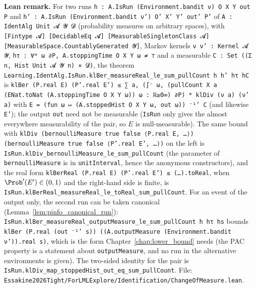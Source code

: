 \textbf{Lean remark.} For two runs \texttt{h : A.IsRun (Environment.bandit ν) O X Y out P} and
\texttt{h' : A.IsRun (Environment.bandit ν') O' X' Y' out' P'} of \texttt{A : IdentAlg Unit 𝓐 𝓨 𝓓}
(probability measures on arbitrary spaces), with \texttt{[Fintype 𝓐] [DecidableEq 𝓐]
[MeasurableSingletonClass 𝓐] [MeasurableSpace.CountablyGenerated 𝓨]}, Markov kernels
\texttt{ν ν' : Kernel 𝓐 𝓨}, \texttt{hτ : ∀ᵐ ω ∂P, A.stoppingTime O X Y ω ≠ ⊤} and a measurable
\texttt{C : Set ((Σ n, Hist Unit 𝓐 𝓨 n) × 𝓓)}, the theorem
\texttt{Learning.IdentAlg.IsRun.klBer\_measureReal\_le\_sum\_pullCount h h' hτ hC} is
\texttt{klBer (P.real E) (P'.real E') ≤ ∑ a, (∫⁻ ω, (pullCount X a (ENat.toNat
(A.stoppingTime O X Y ω)) ω : ℝ≥0∞) ∂P) * klDiv (ν a) (ν' a)} with
\texttt{E = (fun ω ↦ (A.stoppedHist O X Y ω, out ω)) ⁻¹' C} (and likewise \texttt{E'}); the output
\texttt{out} need not be measurable (\texttt{IsRun} only gives the almost everywhere
measurability of the pair, so $E$ is null-measurable). The same bound with
\texttt{klDiv (bernoulliMeasure true false ⟨P.real E, …⟩) (bernoulliMeasure true false ⟨P'.real E', …⟩)}
on the left is \texttt{IsRun.klDiv\_bernoulliMeasure\_le\_sum\_pullCount} (the parameter of
\texttt{bernoulliMeasure} is in \texttt{unitInterval}, hence the anonymous constructors), and the
real form \texttt{klBerReal (P.real E) (P'.real E') ≤ (…).toReal}, when $\Prob'(E') \in (0,1)$ and
the right-hand side is finite, is \texttt{IsRun.klBerReal\_measureReal\_le\_toReal\_sum\_pullCount}.
For an event of the output only, the second run can be taken canonical
(Lemma~\ref{lem:pinfo_canonical_run}):
\texttt{IsRun.klBer\_measureReal\_outputMeasure\_le\_sum\_pullCount h hτ hs} bounds
\texttt{klBer (P.real (out ⁻¹' s)) ((A.outputMeasure (Environment.bandit ν')).real s)}, which is the
form Chapter~\ref{chap:lower_bound} needs (the PAC property is a statement about
\texttt{outputMeasure}, and no run in the alternative environments is given). The two-sided
identity for the pair is \texttt{IsRun.klDiv\_map\_stoppedHist\_out\_eq\_sum\_pullCount}. File:
\texttt{Essakine2026Tight/ForLMLExplore/Identification/ChangeOfMeasure.lean}.

